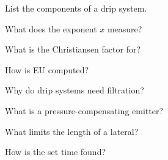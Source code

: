 \begin{exlist}
\item List the components of a drip system.
\item What does the exponent $x$ measure?
\item What is the Christiansen factor for?
\item How is EU computed?
\item Why do drip systems need filtration?
\item What is a pressure-compensating emitter?
\item What limits the length of a lateral?
\item How is the set time found?
\end{exlist}
